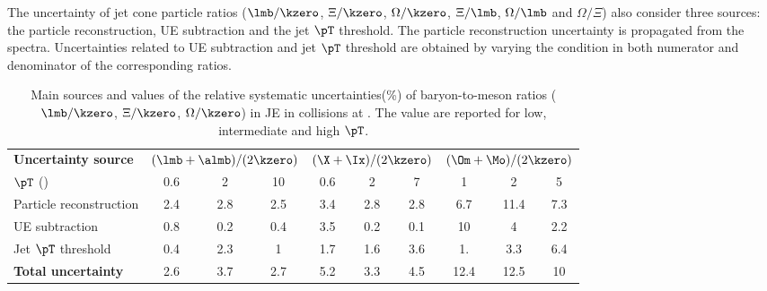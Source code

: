 \documentclass[ALICE,manyauthors]{cernphprep}
\begin{document}
The uncertainty of jet cone particle ratios ($\lmb/\kzero$, $\Xi/\kzero$, $\Omega/\kzero$, $\Xi/\lmb$, $\Omega/\lmb$ and $\Omega/\Xi$) also consider three sources: the particle reconstruction, UE subtraction and the jet $\pT$ threshold.
The particle reconstruction uncertainty is propagated from the spectra.
Uncertainties related to UE subtraction and jet $\pT$ threshold are obtained by varying the condition in both numerator and denominator of the corresponding ratios.

\begin{table}[!ht]
	\begin{center}
		\caption{Main sources and values of the relative systematic uncertainties(\%) of baryon-to-meson ratios ($\lmb/\kzero$, $\Xi/\kzero$, $\Omega/\kzero$) in JE in \pp collisions at \thirteen.
			The value are reported for low, intermediate and high $\pT$.}
		\label{tab:ppBMRatioUncer}
		\begin{tabularx}{\textwidth}{@{} lCCCCCCCCC @{}}
			\toprule
			\textbf{Uncertainty source} & 
			& 
			&  \\
			\cmidrule(lr){2-4} \cmidrule(lr){5-7} \cmidrule(lr){8-10}
			$\pT$ (\GeVc) & 0.6 & 2 &10  & 0.6 & 2 & 7 & 1 & 2 & 5 \\
			\midrule
			Particle reconstruction& 2.4& 2.8& 2.5& 3.4& 2.8& 2.8& 6.7& 11.4& 7.3\\
			UE subtraction& 0.8& 0.2& 0.4& 3.5& 0.2& 0.1& 10& 4& 2.2\\
			Jet $\pT$ threshold& 0.4& 2.3& 1& 1.7& 1.6& 3.6& 1.& 3.3& 6.4\\
			\midrule
			\textbf{Total uncertainty}& 2.6& 3.7& 2.7& 5.2& 3.3& 4.5& 12.4& 12.5& 10\\
			\bottomrule
		\end{tabularx}
	\end{center}
\end{table}
\end{document}
